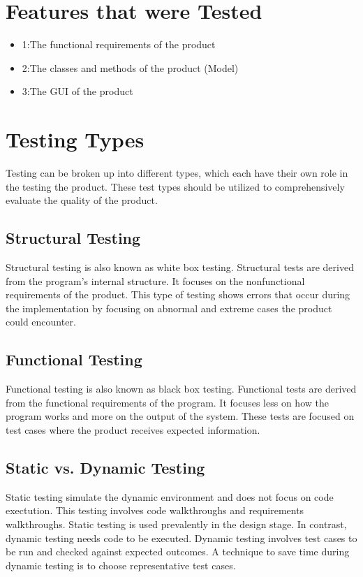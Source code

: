 \documentclass[12pt]{article}
\begin{document}
\tableofcontents
\newpage



\section{Features that were Tested}

\begin{itemize}
\item 1:The functional requirements of the product
\item 2:The classes and methods of the product (Model)
\item 3:The GUI of the product
\end{itemize}

\section{Testing Types}
Testing can be broken up into different types, which each have their own role in the testing the product. These test types should be utilized to comprehensively evaluate the quality of the product.
\subsection{Structural Testing}
Structural testing  is also known as white box testing. Structural tests are derived from the program's internal structure. It focuses on the nonfunctional requirements of the product. This type of testing shows errors that occur during the implementation by focusing on abnormal and extreme cases the product could encounter.
\subsection{Functional Testing}
Functional testing is also known as black box testing. Functional tests are derived from the functional requirements of the program. It focuses less on how the program works and more on the output of the system. These tests are focused on test cases where the product receives expected information.
\subsection{Static vs. Dynamic Testing}
Static testing simulate the dynamic environment and does not focus on code exectution. This testing involves code walkthroughs and requirements walkthroughs. Static testing is used prevalently in the design stage. In contrast, dynamic testing needs code to be executed. \newline\newline
Dynamic testing involves test cases to be run and checked against expected outcomes. A technique to save time during dynamic testing is to choose representative test cases. 
\end{document}
